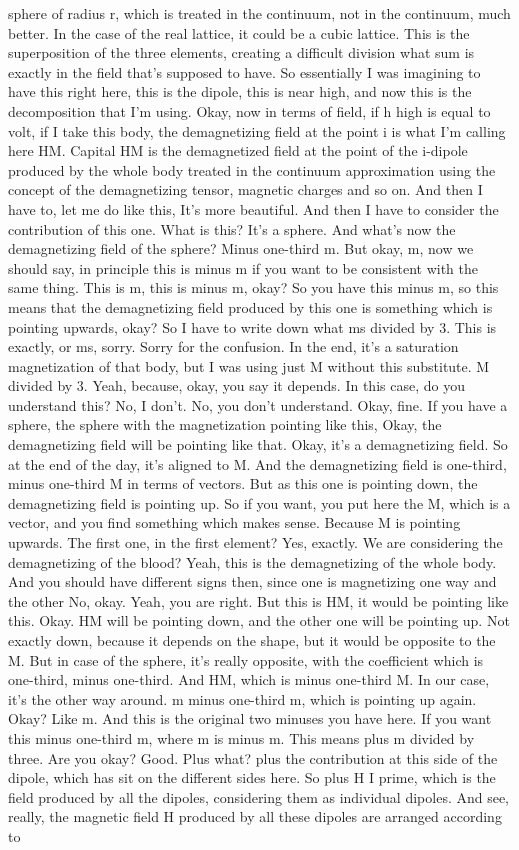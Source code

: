 sphere of radius r, which is treated in the continuum, not in the continuum, much better. In the case of the real lattice, it could be a cubic lattice. This is the superposition of the three elements, creating a difficult division what sum is exactly in the field that's supposed to have. So essentially I was imagining to have this right here, this is the dipole, this is near high, and now this is the decomposition that I'm using. Okay, now in terms of field, if h high is equal to volt, if I take this body, the demagnetizing field at the point i is what I'm calling here HM. Capital HM is the demagnetized field at the point of the i-dipole produced by the whole body treated in the continuum approximation using the concept of the demagnetizing tensor, magnetic charges and so on. And then I have to, let me do like this, It's more beautiful. And then I have to consider the contribution of this one. What is this? It's a sphere. And what's now the demagnetizing field of the sphere? Minus one-third m. But okay, m, now we should say, in principle this is minus m if you want to be consistent with the same thing. This is m, this is minus m, okay? So you have this minus m, so this means that the demagnetizing field produced by this one is something which is pointing upwards, okay? So I have to write down what ms divided by 3. This is exactly, or ms, sorry. Sorry for the confusion. In the end, it's a saturation magnetization of that body, but I was using just M without this substitute. M divided by 3. Yeah, because, okay, you say it depends. In this case, do you understand this? No, I don't. No, you don't understand. Okay, fine. If you have a sphere, the sphere with the magnetization pointing like this, Okay, the demagnetizing field will be pointing like that. Okay, it's a demagnetizing field. So at the end of the day, it's aligned to M. And the demagnetizing field is one-third, minus one-third M in terms of vectors. But as this one is pointing down, the demagnetizing field is pointing up. So if you want, you put here the M, which is a vector, and you find something which makes sense. Because M is pointing upwards. The first one, in the first element? Yes, exactly. We are considering the demagnetizing of the blood? Yeah, this is the demagnetizing of the whole body. And you should have different signs then, since one is magnetizing one way and the other No, okay. Yeah, you are right. But this is HM, it would be pointing like this. Okay. HM will be pointing down, and the other one will be pointing up. Not exactly down, because it depends on the shape, but it would be opposite to the M. But in case of the sphere, it's really opposite, with the coefficient which is one-third, minus one-third. And HM, which is minus one-third M. In our case, it's the other way around. m minus one-third m, which is pointing up again. Okay? Like m. And this is the original two minuses you have here. If you want this minus one-third m, where m is minus m. This means plus m divided by three. Are you okay? Good. Plus what? plus the contribution at this side of the dipole, which has sit on the different sides here. So plus H I prime, which is the field produced by all the dipoles, considering them as individual dipoles. And see, really, the magnetic field H produced by all these dipoles are arranged according to 